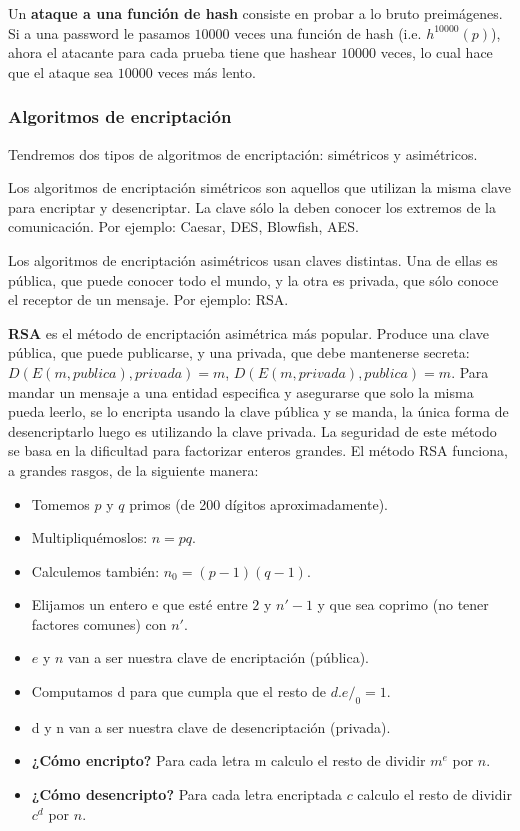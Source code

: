 \documentclass{article}
\begin{document}
Un \textbf{ataque a una función de hash} consiste en probar a lo bruto preimágenes. Si a una password le pasamos $10000$ veces una función de hash (i.e. $h^{10000}(p)$), ahora el atacante para cada prueba tiene que hashear $10000$ veces, lo cual hace que el ataque sea $10000$ veces más lento.

\subsubsection{Algoritmos de encriptación}

Tendremos dos tipos de algoritmos de encriptación: simétricos y asimétricos.

Los algoritmos de encriptación simétricos son aquellos que utilizan la misma clave para encriptar y desencriptar. La clave sólo la deben conocer los extremos de la comunicación. Por ejemplo: Caesar, DES, Blowfish, AES.

Los algoritmos de encriptación asimétricos usan claves distintas. Una de ellas es pública, que puede conocer todo el mundo, y la otra es privada, que sólo conoce el receptor de un mensaje. Por ejemplo: RSA.

\textbf{RSA} es el método de encriptación asimétrica más popular. Produce una clave pública, que puede publicarse, y una privada, que debe mantenerse secreta: $D(E(m, publica), privada) = m$, $D(E(m, privada), publica) = m$. Para mandar un mensaje a una entidad especifica y asegurarse que solo la misma pueda leerlo, se lo encripta usando la clave pública y se manda, la única forma de desencriptarlo luego es utilizando la clave privada. La seguridad de este método se basa en la dificultad para factorizar enteros grandes. El método RSA funciona, a grandes rasgos, de la siguiente manera:

\begin{itemize}
\item Tomemos $p$ y $q$ primos (de 200 dígitos aproximadamente).
\item Multipliquémoslos: $n = pq$.
\item Calculemos también: $n_0 = (p - 1)(q - 1)$.
\item Elijamos un entero e que esté entre $2$ y $n' - 1$ y que sea coprimo (no tener factores comunes) con $n'$.
\item $e$ y $n$ van a ser nuestra clave de encriptación (pública).
\item Computamos d para que cumpla que el resto de $d.e/_0 = 1$.
\item d y n van a ser nuestra clave de desencriptación (privada).
\item \textbf{¿Cómo encripto?} Para cada letra m calculo el resto de dividir $m^e$ por $n$.
\item \textbf{¿Cómo desencripto?} Para cada letra encriptada $c$ calculo el resto de dividir $c^d$ por $n$.
\end{itemize}
\end{document}
